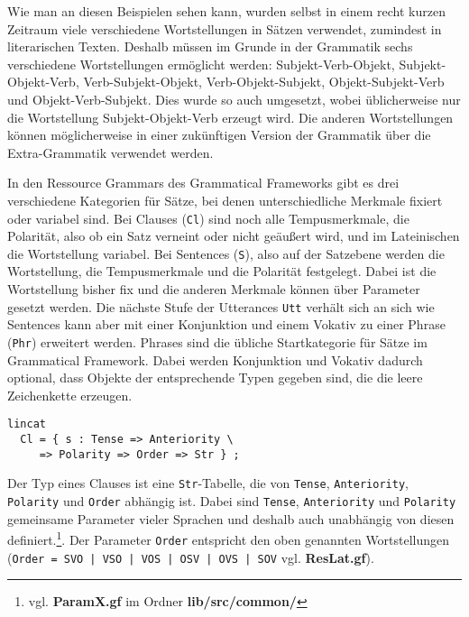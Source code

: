 Wie man an diesen Beispielen sehen kann, wurden selbst in einem recht kurzen Zeitraum viele verschiedene Wortstellungen in Sätzen verwendet, zumindest in literarischen Texten. Deshalb müssen im Grunde in der Grammatik sechs verschiedene Wortstellungen ermöglicht werden: Subjekt-Verb-Objekt, Subjekt-Objekt-Verb, Verb-Subjekt-Objekt, Verb-Objekt-Subjekt, Objekt-Subjekt-Verb und Objekt-Verb-Subjekt. Dies wurde so auch umgesetzt, wobei üblicherweise nur die Wortstellung Subjekt-Objekt-Verb erzeugt wird. Die anderen Wortstellungen können möglicherweise in einer zukünftigen Version der Grammatik über die Extra-Grammatik verwendet werden.\par
In den Ressource Grammars des Grammatical Frameworks gibt es drei verschiedene Kategorien für Sätze, bei denen unterschiedliche Merkmale fixiert oder variabel sind. Bei Clauses (\texttt{Cl}) sind noch alle Tempusmerkmale, die Polarität, also ob ein Satz verneint oder nicht geäußert wird, und im Lateinischen die Wortstellung variabel. Bei Sentences (\texttt{S}), also auf der Satzebene werden die Wortstellung, die Tempusmerkmale und die Polarität festgelegt. Dabei ist die Wortstellung bisher fix und die anderen Merkmale können über Parameter gesetzt werden. Die nächste Stufe der Utterances \texttt{Utt} verhält sich an sich wie Sentences kann aber mit einer Konjunktion und einem Vokativ zu einer Phrase (\texttt{Phr}) erweitert werden. Phrases sind die übliche Startkategorie für Sätze im Grammatical Framework. Dabei werden Konjunktion und Vokativ dadurch optional, dass Objekte der entsprechende Typen gegeben sind, die die leere Zeichenkette erzeugen. \par
\begin{lstlisting}[float=h!tp,caption={Typ von Clauses (vgl. \textbf{CalLat.gf})},label={GF-Cat-Cl}]
lincat
  Cl = { s : Tense => Anteriority \
     => Polarity => Order => Str } ;
\end{lstlisting}
Der Typ eines Clauses ist eine \texttt{Str}-Tabelle, die von \texttt{Tense}, \texttt{Anteriority}, \texttt{Polarity} und \texttt{Order} abhängig ist. Dabei sind \texttt{Tense}, \texttt{Anteriority} und \texttt{Polarity} gemeinsame Parameter vieler Sprachen und deshalb auch unabhängig von diesen definiert.\footnote{vgl. \textbf{ParamX.gf} im Ordner \textbf{lib/src/common/}}. Der Parameter \texttt{Order} entspricht den oben genannten Wortstellungen (\texttt{Order = SVO | VSO | VOS | OSV | OVS | SOV} vgl. \textbf{ResLat.gf}). \par
